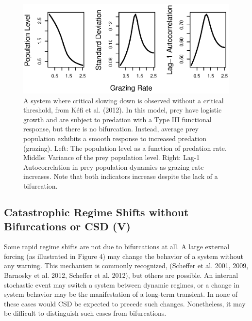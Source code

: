 \documentclass{article}
\begin{document}
\begin{figure}[htbp]
\centering
\includegraphics{kefi-fig.eps}
\caption{A system where critical slowing down is observed without a
critical threshold, from Kéfi et al. (2012). In this model, prey have
logistic growth and are subject to predation with a Type III functional
response, but there is no bifurcation. Instead, average prey population
exhibits a smooth response to increased predation (grazing). Left: The
population level as a function of predation rate. Middle: Variance of
the prey population level. Right: Lag-1 Autocorrelation in prey
population dynamics as grazing rate increases. Note that both indicators
increase despite the lack of a bifurcation.}
\end{figure}

\subsection{Catastrophic Regime Shifts without Bifurcations or CSD (V)}

Some rapid regime shifts are not due to bifurcations at all. A large
external forcing (as illustrated in Figure 4) may change the behavior of
a system without any warning. This mechanism is commonly recognized,
(Scheffer et al. 2001, 2009, Barnosky et al. 2012, Scheffer et al.
2012), but others are possible. An internal stochastic event may switch
a system between dynamic regimes, or a change in system behavior may be
the manifestation of a long-term transient. In none of these cases would
CSD be expected to precede such changes. Nonetheless, it may be
difficult to distinguish such cases from bifurcations.
\end{document}
